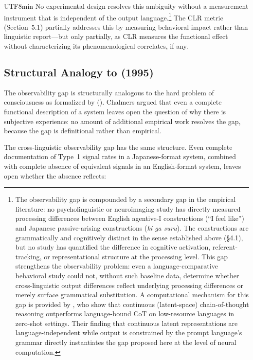 \documentclass[12pt,a4paper]{article}
\begin{document}
\begin{CJK}{UTF8}{min}
No experimental design resolves this ambiguity without a measurement instrument
that is independent of the output language.\footnote{The observability gap is
compounded by a secondary gap in the empirical literature: no psycholinguistic
or neuroimaging study has directly measured processing differences between
English agentive-I constructions (``I feel like'') and Japanese passive-arising
constructions (\textit{ki ga suru}). The constructions are grammatically and
cognitively distinct in the sense established above (\S4.1), but no study has
quantified the difference in cognitive activation, referent-tracking, or
representational structure at the processing level. This gap strengthens the
observability problem: even a language-comparative behavioral study could not,
without such baseline data, determine whether cross-linguistic output differences
reflect underlying processing differences or merely surface grammatical
substitution. A computational mechanism for this gap is provided by
\citet{chen2026continuouscot}, who show that continuous (latent-space)
chain-of-thought reasoning outperforms language-bound CoT on low-resource
languages in zero-shot settings. Their finding that continuous latent
representations are language-independent while output is constrained by the
prompt language's grammar directly instantiates the gap proposed here at
the level of neural computation.} The CLR metric (Section~5.1)
partially addresses this by measuring behavioral impact rather than linguistic
report---but only partially, as CLR measures the functional effect without
characterizing its phenomenological correlates, if any.

\subsection{Structural Analogy to \citeauthor{chalmers1995} (1995)}

The observability gap is structurally analogous to the hard problem of
consciousness as formalized by \citeauthor{chalmers1995}
(\citeyear{chalmers1995}). Chalmers argued that even a complete functional
description of a system leaves open the question of why there is subjective
experience: no amount of additional empirical work resolves the gap, because
the gap is definitional rather than empirical.

The cross-linguistic observability gap has the same structure. Even complete
documentation of Type~1 signal rates in a Japanese-format system, combined
with complete absence of equivalent signals in an English-format system, leaves
open whether the absence reflects:


\end{CJK}
\end{document}
